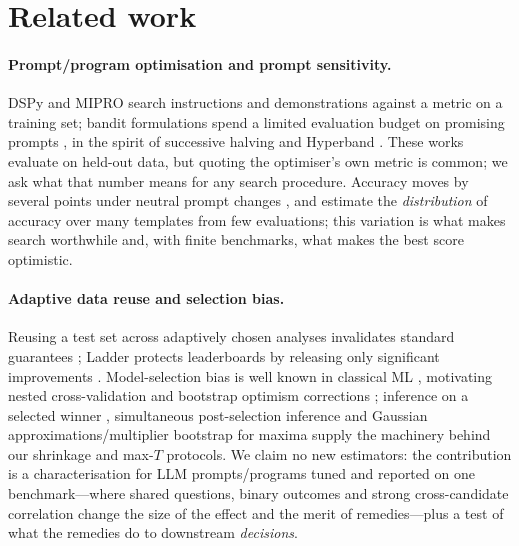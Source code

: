 \section{Related work}\label{sec:related}
\paragraph{Prompt/program optimisation and prompt sensitivity.}
DSPy \citep{khattab2023dspy} and MIPRO \citep{opsahl2024mipro} search instructions and demonstrations against a metric on a training set; bandit formulations spend a limited evaluation budget on promising prompts \citep{shi2024bai}, in the spirit of successive halving and Hyperband \citep{jamieson2016nonstochastic,li2018hyperband}. These works evaluate on held-out data, but quoting the optimiser's own metric is common; we ask what that number means for any search procedure. Accuracy moves by several points under neutral prompt changes \citep{sclar2024quantifying}, and \citet{polo2024efficient} estimate the \emph{distribution} of accuracy over many templates from few evaluations; this variation is what makes search worthwhile and, with finite benchmarks, what makes the best score optimistic.

\paragraph{Adaptive data reuse and selection bias.}
Reusing a test set across adaptively chosen analyses invalidates standard guarantees \citep{dwork2015preserving}; Ladder protects leaderboards by releasing only significant improvements \citep{blum2015ladder}. Model-selection bias is well known in classical ML \citep{varma2006bias,cawley2010overfitting}, motivating nested cross-validation and bootstrap optimism corrections \citep{efron1997improvements}; inference on a selected winner \citep{andrews2024inference}, simultaneous post-selection inference \citep{berk2013valid} and Gaussian approximations/multiplier bootstrap for maxima \citep{chernozhukov2013gaussian} supply the machinery behind our shrinkage and max-$T$ protocols. We claim no new estimators: the contribution is a characterisation for LLM prompts/programs tuned and reported on one benchmark---where shared questions, binary outcomes and strong cross-candidate correlation change the size of the effect and the merit of remedies---plus a test of what the remedies do to downstream \emph{decisions}.

